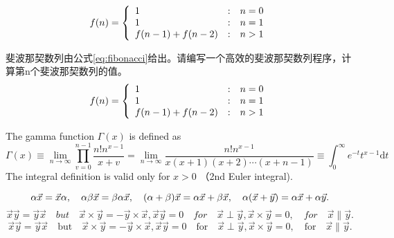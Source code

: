 \documentclass{article}
\begin{document}
    \begin{displaymath}
        f(n)=\left\{
            \begin{array}{l@{\quad:\quad}l}
                1  & n=0 \\
                1  & n=1 \\
                f(n-1) + f(n-2) & n>1
            \end{array}
        \right.
    \end{displaymath}

    斐波那契数列由公式\ref{eq:fibonacci}给出。请编写一个高效的斐波那契数列程序，计算第n个斐波那契数列的值。
    \begin{equation}
        \label{eq:fibonacci}
        f(n)=\left\{
            \begin{array}{l@{\quad:\quad}l}
                1  & n=0 \\
                1  & n=1 \\
                f(n-1) + f(n-2) & n>1
            \end{array}
        \right.
    \end{equation}

    The gamma function $\Gamma(x)$ is defined as
    \begin{displaymath}
        \Gamma(x) \equiv \lim_{n\to\infty} \prod_{v=0}^{n-1} \frac{n!n^{x-1}}{x+v}=\lim_{n\to\infty} \frac{n!n^{x-1}}{x(x+1)(x+2)\cdots(x+n-1)} \equiv \int_0^\infty e^{-t}t^{x-1}\mathrm{d}t
    \end{displaymath}
    The integral definition is valid only for $x>0$ （2nd Euler integral).

    \begin{displaymath}
        \alpha\vec{x} = \vec{x}\alpha,\quad \alpha\beta\vec{x} = \beta\alpha\vec{x},\quad (\alpha + \beta)\vec{x} = \alpha\vec{x} + \beta\vec{x}, \quad \alpha(\vec{x} + \vec{y})=\alpha\vec{x} + \alpha\vec{y}.\\
    \end{displaymath}
    \begin{displaymath}
        \vec{x}\vec{y}=\vec{y}\vec{x}\quad but \quad \vec{x} \times \vec{y} = -\vec{y} \times \vec{x}, \vec{x}\vec{y}=0\quad for \quad\vec{x}\perp\vec{y}, \vec{x} \times \vec{y} = 0,\quad for\quad \vec{x} \parallel \vec{y}.
    \end{displaymath}
    \begin{displaymath}
        \vec{x}\vec{y}=\vec{y}\vec{x}\quad \mbox{but} \quad \vec{x} \times \vec{y} = -\vec{y} \times \vec{x}, \vec{x}\vec{y}=0\quad \mbox{for}\quad\vec{x}\perp\vec{y}, \vec{x} \times \vec{y} = 0,\quad \mbox{for}\quad \vec{x} \parallel \vec{y}.
    \end{displaymath}
\end{document}
